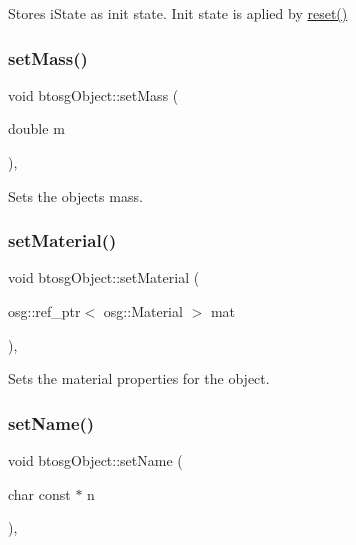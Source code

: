 Stores i\+State as init state. Init state is aplied by \hyperlink{classbtosgObject_a93983f9180dd0672f8779cf2baa78580}{reset()} \mbox{\label{classbtosgObject_a91da93c82d48b86192f0cbb16054fe57}} 
\subsubsection{\texorpdfstring{set\+Mass()}{setMass()}}
{\footnotesize\ttfamily void btosg\+Object\+::set\+Mass (\begin{DoxyParamCaption}\item[{double}]{m }\end{DoxyParamCaption})\hspace{0.3cm}{\ttfamily [inline]}, {\ttfamily [inherited]}}

Sets the object\textquotesingle{}s mass. \mbox{\label{classbtosgObject_a6ab7b9e0553dab398b980637788b56a8}} 
\subsubsection{\texorpdfstring{set\+Material()}{setMaterial()}}
{\footnotesize\ttfamily void btosg\+Object\+::set\+Material (\begin{DoxyParamCaption}\item[{osg\+::ref\+\_\+ptr$<$ osg\+::\+Material $>$}]{mat }\end{DoxyParamCaption})\hspace{0.3cm}{\ttfamily [inline]}, {\ttfamily [inherited]}}

Sets the material properties for the object. \mbox{\label{classbtosgObject_ab06a1b3f357209214c6440cd5746523e}} 
\subsubsection{\texorpdfstring{set\+Name()}{setName()}}
{\footnotesize\ttfamily void btosg\+Object\+::set\+Name (\begin{DoxyParamCaption}\item[{char const $\ast$}]{n }\end{DoxyParamCaption})\hspace{0.3cm}{\ttfamily [inline]}, {\ttfamily [inherited]}}

